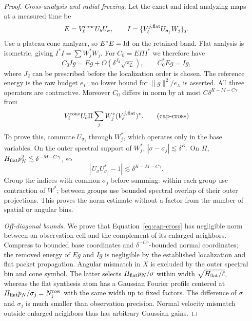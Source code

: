 \begin{proof}
\smallskip\noindent
\emph{Cross-analysis and radial freezing.}
Let the exact and ideal analyzing maps at a measured time be
\[
 E=V^{\rm cone}_\ell U_bU_\sigma,\qquad
 I=\{V^{j,\rm flat}_\ell U_{\sigma_j}W_j\}_j.
\]
Use a plateau cone analyzer, so $E^*E=\mathrm{Id}$ on the retained band.
Flat analysis is isometric, giving $I^*I=\sum W_j^*W_j$.
For $C_0=E\Pi I^*$ we therefore have
\[
 C_0Ig=Eg+O(\delta^{J_2}\sqrt{e_L}),\qquad C_0^*Eg=Ig,
\]
where $J_2$ can be prescribed before the localization order is chosen.
The reference energy is the raw budget $e_L$; no lower bound for
$\|g\|^2/e_L$ is asserted.  All three operators are contractive.
Moreover $C_0$ differs in norm by at most
$C\delta^{K-M-C\gamma}$ from
\begin{equation}
 V_\ell^{\rm cone}U_b\Pi
       \sum_jW_j^*(V_\ell^{j,\rm flat})^*.
 \tag{cap-cross}\label{eq:cap-cross}
\end{equation}
To prove this, commute $U_{\sigma_j}$ through $W_j^*$, which operates
only in the base variables.  On the outer spectral support of $W_j^*$,
$|\sigma-\sigma_j|\lesssim\delta^K$.  On $\Pi$,
$H_{\rm flat}p_N^2\lesssim\delta^{-M-C\gamma}$, so
\[
 |U_\sigma U_{\sigma_j}^*-1|
       \lesssim\delta^{K-M-C\gamma}.
\]
Group the indices with common $\sigma_j$ before summing: within each
group use contraction of $W^*$; between groups use bounded spectral
overlap of their outer projections.  This proves the norm estimate
without a factor from the number of spatial or angular bins.

\smallskip\noindent
\emph{Off-diagonal bounds.}
We prove that Equation~\eqref{eq:cap-cross} has negligible norm
between an observation cell and the complement of its enlarged
neighbors.  Compress to bounded base coordinates and
$\delta^{-C\gamma}$-bounded normal coordinates; the removed energy of
$Eg$ and $Ig$ is negligible by the established localization and flat
packet propagation.  Angular mismatch in $X$ is excluded by the outer
spectral bin and cone symbol.  The latter selects
$H_{\rm flat}p_N/\sigma$ within width
$\sqrt{H_{\rm flat}/\ell}$, whereas the flat synthesis atom has a
Gaussian Fourier profile centered at
$H_{\rm flat}p_N/\sigma_j=N_j^{\rm row}$ with the same width up to
fixed factors.  The difference of $\sigma$ and $\sigma_j$ is much
smaller than observation precision.  Normal velocity mismatch outside
enlarged neighbors thus has arbitrary Gaussian gains.


\end{proof}
